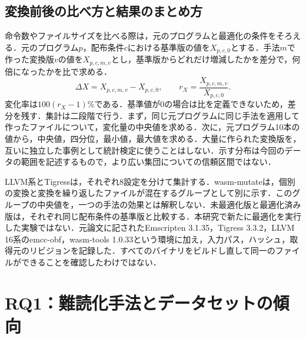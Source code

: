 \documentclass[submit,techrep]{ipsj}
\begin{document}
\subsection{変換前後の比べ方と結果のまとめ方}
命令数やファイルサイズを比べる際は，元のプログラムと最適化の条件をそろえる．元のプログラム$p$，配布条件$c$における基準版の値を$X_{p,c,0}$とする．手法$m$で作った変換版$v$の値を$X_{p,c,m,v}$とし，基準版からどれだけ増減したかを差分で，何倍になったかを比で求める．
\[
\Delta X=X_{p,c,m,v}-X_{p,c,0},\qquad
r_X=\frac{X_{p,c,m,v}}{X_{p,c,0}}.
\]
変化率は$100(r_X-1)$\%である．基準値が0の場合は比を定義できないため，差分を残す．集計は二段階で行う．まず，同じ元プログラムに同じ手法を適用して作ったファイルについて，変化量の中央値を求める．次に，元プログラム10本の値から，中央値，四分位，最小値，最大値を求める．大量に作られた変換版を，互いに独立した事例として統計検定に使うことはしない．示す分布は今回のデータの範囲を記述するもので，より広い集団についての信頼区間ではない．

LLVM系とTigressは，それぞれ8設定を分けて集計する．wasm-mutateは，個別の変換と変換を繰り返したファイルが混在するグループとして別に示す．このグループの中央値を，一つの手法の効果とは解釈しない．未最適化版と最適化済み版は，それぞれ同じ配布条件の基準版と比較する．本研究で新たに最適化を実行した実験ではない．元論文に記されたEmscripten 3.1.35，Tigress 3.3.2，LLVM 16系のemcc-obf，wasm-tools 1.0.33という環境に加え，入力パス，ハッシュ，取得元のリビジョンを記録した．すべてのバイナリをビルドし直して同一のファイルができることを確認したわけではない．

\section{RQ1：難読化手法とデータセットの傾向}
\end{document}
